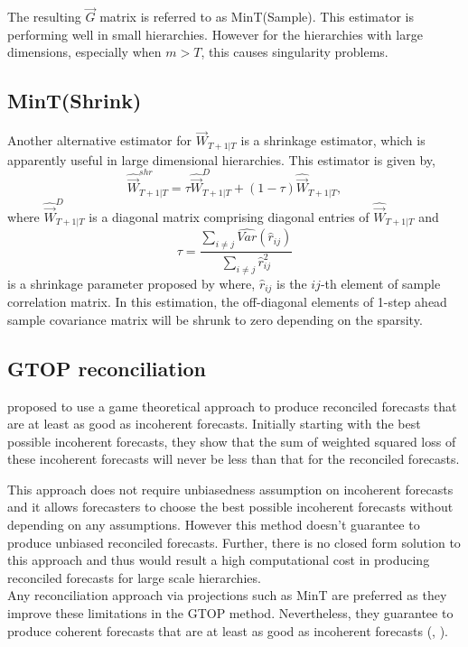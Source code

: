 \documentclass[graybox]{svmult}
\begin{document}
The resulting $\vec{G}$ matrix is referred to as MinT(Sample). This estimator is performing well in small hierarchies. However for the hierarchies with large dimensions, especially when $m>T$, this causes singularity problems.

\subsection*{MinT(Shrink)}

Another alternative estimator for ${\vec{W}}_{T+1|T}$ is a shrinkage estimator, which is apparently useful in large dimensional hierarchies. This estimator is given by,
\begin{equation} \label{eq:16}
\hat{{\vec{W}}}_{T+1|T}^{shr} = \tau\hat{{\vec{W}}}_{T+1|T}^D + (1-\tau)\hat{{\vec{W}}}_{T+1|T},
\end{equation}
where $\hat{{\vec{W}}}_{T+1|T}^D$ is a diagonal matrix comprising diagonal entries of $\hat{{\vec{W}}}_{T+1|T}$ and
$$\tau = \frac{\sum_{i \ne j}\hat{Var}(\hat{r}_{ij})}{\sum_{i \ne j}\hat{r}_{ij}^2}$$ is a shrinkage parameter proposed by \citet{schafer2005} where, $\hat{r}_{ij}$ is the $ij$-th element of sample correlation matrix.  In this estimation, the off-diagonal elements of 1-step ahead sample covariance matrix will be shrunk to zero depending on the sparsity.



\subsection{GTOP reconciliation}

\cite{VanErven2015a} proposed to use a game theoretical approach to produce reconciled forecasts that are at least as good as incoherent forecasts. Initially starting with the best possible incoherent forecasts, they show that the sum of weighted squared loss of these incoherent forecasts will never be less than that for the reconciled forecasts.

This approach does not require unbiasedness assumption on incoherent forecasts and it allows forecasters to choose the best possible incoherent forecasts without depending on any assumptions. However this method doesn't guarantee to produce unbiased reconciled forecasts. Further, there is no closed form solution to this approach and thus would result a high computational cost in producing reconciled forecasts for large scale hierarchies.\\


Any reconciliation approach via projections such as MinT are preferred as they improve these limitations in the GTOP method. Nevertheless, they guarantee to produce coherent forecasts that are at least as good as incoherent forecasts (\cite{Wickramasuriya2018}, \cite{Gamakumara2018}).
\end{document}
